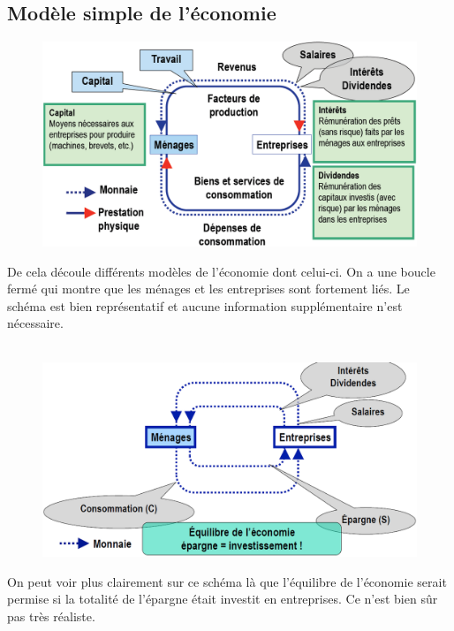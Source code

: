 \subsection{Modèle simple de l'économie}
\begin{figure}
	\includegraphics[scale=0.3]{52}
\end{figure}
De cela découle différents modèles de l'économie dont celui-ci. On a une boucle fermé qui montre que les ménages et les entreprises sont fortement liés. Le schéma est bien représentatif et aucune information supplémentaire n'est nécessaire. \\\\

\begin{figure}
	\includegraphics[scale=0.3]{53}
\end{figure}
On peut voir plus clairement sur ce schéma là que l'équilibre de l'économie serait permise si la totalité de l'épargne était investit en entreprises. Ce n'est bien sûr pas très réaliste.  \\\\\\\\\\\

